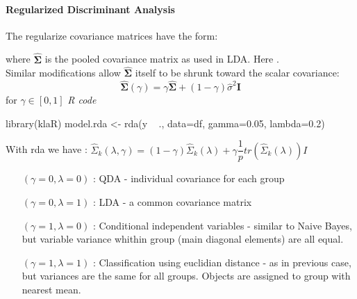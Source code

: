 \paragraph{Regularized Discriminant Analysis}
The regularize covariance matrices have the form:
\begin{center}
\end{center}
where $\hat{\bm{\Sigma}}$ is the pooled covariance matrix as used in LDA.
Here .\\
Similar modifications allow $\hat{\bm{\Sigma}}$ itself to be shrunk toward the scalar covariance:
$$ \hat{\bm{\Sigma}}(\gamma) = \gamma\hat{\bm{\Sigma}} + (1-\gamma)\hat{\sigma}^{2}\bm{I}$$
for $\gamma\in [0, 1]$
\emph{R code}
\begin{rcode}
library(klaR)
model.rda <- rda(y ~ ., data=df, gamma=0.05, lambda=0.2)
\end{rcode}
With rda we have :
$\hat{\Sigma}_{k}(\lambda, \gamma)=(1-\gamma)\hat{\Sigma}_{k}(\lambda)+\gamma\dfrac{1}{p}
tr\left(\hat{\Sigma}_{k}(\lambda)\right)I$
\begin{itemize}
	\item[$(\gamma=0,\lambda=0)$]: QDA - individual covariance for each group
	\item[$(\gamma=0,\lambda=1)$]: LDA - a common covariance matrix
	\item[$(\gamma=1,\lambda=0)$]: Conditional independent variables - similar to Naive Bayes,
		but variable variance whithin group (main diagonal elements) are all equal.
	\item[$(\gamma=1,\lambda=1)$]: Classification using euclidian distance - as in previous case,
		but variances are the same for all groups. Objects are assigned to group with nearest
		mean.
\end{itemize}

